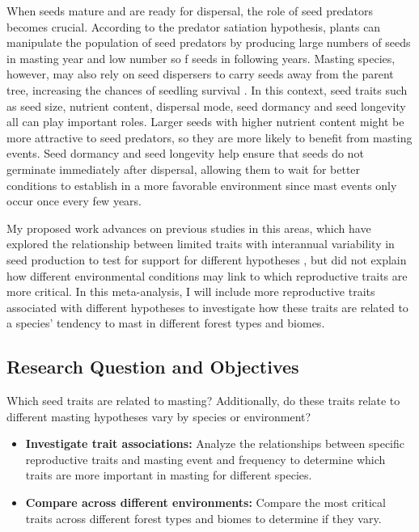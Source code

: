 \documentclass[11pt,letter]{article}
\begin{document}
When seeds mature and are ready for dispersal, the role of seed predators becomes crucial. According to the predator satiation hypothesis, plants can manipulate the population of seed predators by producing large numbers of seeds in masting year and low number so f seeds in following years. Masting species, however, may also rely on seed dispersers to carry seeds away from the parent tree, increasing the chances of seedling survival \citep{janzen1971seed, silvertown1980evolutionary}. In this context, seed traits such as seed size, nutrient content, dispersal mode, seed dormancy and seed longevity all can play important roles. Larger seeds with higher nutrient content might be more attractive to seed predators, so they are more likely to benefit from masting events. Seed dormancy and seed longevity help ensure that seeds do not germinate immediately after dispersal, allowing them to wait for better conditions to establish in a more favorable environment since mast events only occur once every few years.\par

My proposed work advances on previous studies in this areas, which have explored the relationship between limited traits with interannual variability in seed production to test for support for different hypotheses \citep{fernandez2019nutrient, journe2023evolution, pearse2020biogeography}, but did not explain how different environmental conditions may link to which reproductive traits are more critical. In this meta-analysis, I will include more reproductive traits associated with different hypotheses to investigate how these traits are related to a species' tendency to mast in different forest types and biomes.\par

\subsection{Research Question and Objectives}
Which seed traits are related to masting? Additionally, do these traits relate to different masting hypotheses vary by species or environment?
	\begin{itemize}
	\item \textbf{Investigate trait associations:} Analyze the relationships between specific reproductive traits and masting event and frequency to determine which traits are more important in masting for different species.
	\item \textbf{Compare across different environments:} Compare the most critical traits across different forest types and biomes to determine if they vary.
	\end{itemize}
\end{document}

